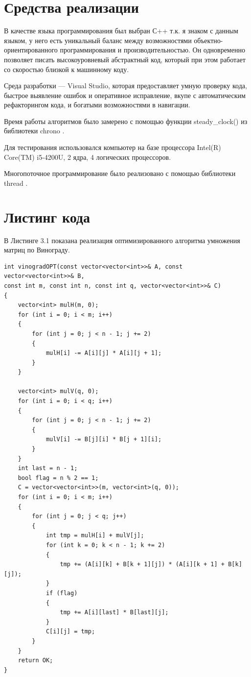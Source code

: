 \documentclass[12pt]{report}
\begin{document}
\section{Средства реализации}
В качестве языка программирования был выбран С++ т.к. я знаком с данным языком, у него есть уникальный баланс между возможностями объектно-ориентированного программирования и производительностью. Он одновременно позволяет писать высокоуровневый абстрактный код, который при этом работает со скоростью близкой к машинному коду.

Среда разработки — Visual Studio, которая предоставляет умную проверку кода, быстрое выявление ошибок и оперативное исправление, вкупе с автоматическим рефакторингом кода, и богатыми возможностями в навигации.  

Время работы алгоритмов было замерено с помощью функции steady\_clock() из библиотеки chrono \cite{chrono}. 

Для тестирования использовался компьютер на базе процессора Intel(R) Core(TM) i5-4200U, 2 ядра, 4 логических процессоров. 

Многопоточное программирование было
реализовано с помощью библиотеки thread \cite{thread}.

\newpage
\section{Листинг кода}

\hspace{0.2cm}В Листинге 3.1 показана реализация оптимизированного алгоритма умножения матриц по Винограду.

\begin{lstlisting}[label=some-code,caption=Оптимизированный алгоритм умножения матриц по Винограду]
int vinogradOPT(const vector<vector<int>>& A, const vector<vector<int>>& B,
const int m, const int n, const int q, vector<vector<int>>& C)
{
	vector<int> mulH(m, 0);
	for (int i = 0; i < m; i++)
	{
		for (int j = 0; j < n - 1; j += 2)
		{
			mulH[i] -= A[i][j] * A[i][j + 1];
		}
	}
	
	vector<int> mulV(q, 0);
	for (int i = 0; i < q; i++)
	{
		for (int j = 0; j < n - 1; j += 2)
		{
			mulV[i] -= B[j][i] * B[j + 1][i];
		}
	}
	int last = n - 1;
	bool flag = n % 2 == 1;
	C = vector<vector<int>>(m, vector<int>(q, 0));
	for (int i = 0; i < m; i++)
	{
		for (int j = 0; j < q; j++)
		{
			int tmp = mulH[i] + mulV[j];
			for (int k = 0; k < n - 1; k += 2)
			{
				tmp += (A[i][k] + B[k + 1][j]) * (A[i][k + 1] + B[k][j]);
			}
			if (flag)
			{
				tmp += A[i][last] * B[last][j];
			}
			C[i][j] = tmp;
		}
	}
	return OK;
}
\end{lstlisting}
\end{document}
